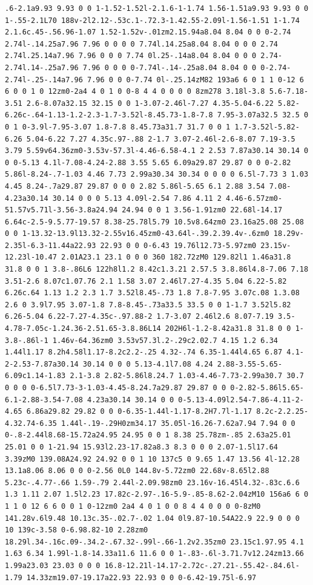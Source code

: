 \documentclass[11pt]{article}
\begin{document}
\begin{enumerate}
\begin{verbatim}
.6-2.1a9.93 9.93 0 0 1-1.52-1.52l-2.1.6-1-1.74 1.56-1.51a9.93 9.93 0 0 1-.55-2.1L70 188v-2l2.12-.53c.1-.72.3-1.42.55-2.09l-1.56-1.51 1-1.74 2.1.6c.45-.56.96-1.07 1.52-1.52v-.01zm2.15.94a8.04 8.04 0 0 0-2.74 2.74l-.14.25a7.96 7.96 0 0 0 0 7.74l.14.25a8.04 8.04 0 0 0 2.74 2.74l.25.14a7.96 7.96 0 0 0 7.74 0l.25-.14a8.04 8.04 0 0 0 2.74-2.74l.14-.25a7.96 7.96 0 0 0 0-7.74l-.14-.25a8.04 8.04 0 0 0-2.74-2.74l-.25-.14a7.96 7.96 0 0 0-7.74 0l-.25.14zM82 193a6 6 0 1 1 0-12 6 6 0 0 1 0 12zm0-2a4 4 0 1 0 0-8 4 4 0 0 0 0 8zm278 3.18l-3.8 5.6-7.18-3.51 2.6-8.07a32.15 32.15 0 0 1-3.07-2.46l-7.27 4.35-5.04-6.22 5.82-6.26c-.64-1.13-1.2-2.3-1.7-3.52l-8.45.73-1.8-7.8 7.95-3.07a32.5 32.5 0 0 1 0-3.9l-7.95-3.07 1.8-7.8 8.45.73a31.7 31.7 0 0 1 1.7-3.52l-5.82-6.26 5.04-6.22 7.27 4.35c.97-.88 2-1.7 3.07-2.46l-2.6-8.07 7.19-3.5 3.79 5.59v64.36zm0-3.53v-57.3l-4.46-6.58-4.1 2 2.53 7.87a30.14 30.14 0 0 0-5.13 4.1l-7.08-4.24-2.88 3.55 5.65 6.09a29.87 29.87 0 0 0-2.82 5.86l-8.24-.7-1.03 4.46 7.73 2.99a30.34 30.34 0 0 0 0 6.5l-7.73 3 1.03 4.45 8.24-.7a29.87 29.87 0 0 0 2.82 5.86l-5.65 6.1 2.88 3.54 7.08-4.23a30.14 30.14 0 0 0 5.13 4.09l-2.54 7.86 4.11 2 4.46-6.57zm0-51.57v5.71l-3.56-3.8a24.94 24.94 0 0 1 3.56-1.91zm0 22.68l-14.17 6.64c-2.5-9.5.77-19.57 8.38-25.78l5.79 10.5v8.64zm0 23.16a25.08 25.08 0 0 1-13.32-13.9l13.32-2.55v16.45zm0-43.64l-.39.2.39.4v-.6zm0 18.29v-2.35l-6.3-11.44a22.93 22.93 0 0 0-6.43 19.76l12.73-5.97zm0 23.15v-12.23l-10.47 2.01A23.1 23.1 0 0 0 360 182.72zM0 129.82l1 1.46a31.8 31.8 0 0 1 3.8-.86L6 122h8l1.2 8.42c1.3.21 2.57.5 3.8.86l4.8-7.06 7.18 3.51-2.6 8.07c1.07.76 2.1 1.58 3.07 2.46l7.27-4.35 5.04 6.22-5.82 6.26c.64 1.13 1.2 2.3 1.7 3.52l8.45-.73 1.8 7.8-7.95 3.07c.08 1.3.08 2.6 0 3.9l7.95 3.07-1.8 7.8-8.45-.73a33.5 33.5 0 0 1-1.7 3.52l5.82 6.26-5.04 6.22-7.27-4.35c-.97.88-2 1.7-3.07 2.46l2.6 8.07-7.19 3.5-4.78-7.05c-1.24.36-2.51.65-3.8.86L14 202H6l-1.2-8.42a31.8 31.8 0 0 1-3.8-.86l-1 1.46v-64.36zm0 3.53v57.3l.2-.29c2.02.7 4.15 1.2 6.34 1.44l1.17 8.2h4.58l1.17-8.2c2.2-.25 4.32-.74 6.35-1.44l4.65 6.87 4.1-2-2.53-7.87a30.14 30.14 0 0 0 5.13-4.1l7.08 4.24 2.88-3.55-5.65-6.09c1.14-1.83 2.1-3.8 2.82-5.86l8.24.7 1.03-4.46-7.73-2.99a30.7 30.7 0 0 0 0-6.5l7.73-3-1.03-4.45-8.24.7a29.87 29.87 0 0 0-2.82-5.86l5.65-6.1-2.88-3.54-7.08 4.23a30.14 30.14 0 0 0-5.13-4.09l2.54-7.86-4.11-2-4.65 6.86a29.82 29.82 0 0 0-6.35-1.44l-1.17-8.2H7.7l-1.17 8.2c-2.2.25-4.32.74-6.35 1.44l-.19-.29H0zm34.17 35.05l-16.26-7.62a7.94 7.94 0 0 0-.8-2.44l8.68-15.72a24.95 24.95 0 0 1 8.38 25.78zm-.85 2.63a25.01 25.01 0 0 1-21.94 15.93l2.23-17.82a8.3 8.3 0 0 0 2.07-1.5l17.64 3.39zM0 139.08A24.92 24.92 0 0 1 10 137c5 0 9.65 1.47 13.56 4l-12.28 13.1a8.06 8.06 0 0 0-2.56 0L0 144.8v-5.72zm0 22.68v-8.65l2.88 5.23c-.4.77-.66 1.59-.79 2.44l-2.09.98zm0 23.16v-16.45l4.32-.83c.6.6 1.3 1.11 2.07 1.5l2.23 17.82c-2.97-.16-5.9-.85-8.62-2.04zM10 156a6 6 0 1 1 0 12 6 6 0 0 1 0-12zm0 2a4 4 0 1 0 0 8 4 4 0 0 0 0-8zM0 141.28v.6l9.48 10.13c.35-.02.7-.02 1.04 0l9.87-10.54A22.9 22.9 0 0 0 10 139c-3.58 0-6.98.82-10 2.28zm0 18.29l.34-.16c.09-.34.2-.67.32-.99l-.66-1.2v2.35zm0 23.15c1.97.95 4.1 1.63 6.34 1.99l-1.8-14.33a11.6 11.6 0 0 1-.83-.6l-3.71.7v12.24zm13.66 1.99a23.03 23.03 0 0 0 16.8-12.21l-14.17-2.72c-.27.21-.55.42-.84.6l-1.79 14.33zm19.07-19.17a22.93 22.93 0 0 0-6.42-19.75l-6.97 
\end{verbatim}
\end{enumerate}
\end{document}
